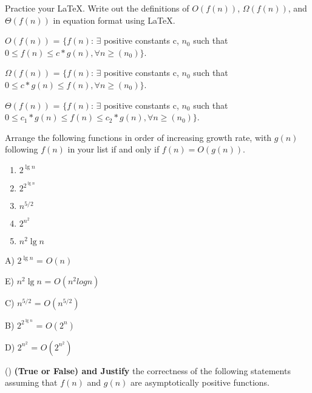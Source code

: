 \documentclass[addpoints,11pt]{exam}
\begin{document}
\begin{questions}


\question[5]
Practice your \LaTeX.  Write out the definitions of $O(f(n))$, $\Omega(f(n))$, and $\Theta(f(n))$ in equation format using \LaTeX. 
\begin{solutionorbox}
        $O(f(n))$ = $\{f(n)$: $\exists$ positive constants c, $n_0$ such that $0 \leq f(n) \leq c*g(n), \forall n \geq (n_0)\}$.
        
        $\Omega(f(n))$ = $\{f(n)$: $\exists$ positive constants c, $n_0$ such that $0 \leq c*g(n) \leq f(n), \forall n \geq (n_0)\}$.

        $\Theta(f(n))$ = $\{f(n)$: $\exists$ positive constants c, $n_0$ such that $0 \leq c_1*g(n) \leq f(n) \leq c_2*g(n), \forall n \geq (n_0)\}$.
\end{solutionorbox}

\newpage


\question[5]  Arrange the following functions in order of increasing growth rate, with $g(n)$ following $f(n)$ in your list if and only if $f(n) = O(g(n))$.
\begin{enumerate}[label=(\alph*)]
	\item $2^{\lg n}$
	\item $2^{2^{\lg n}}$
	\item $n^{5/2}$
	\item $2^{n^{2}}$
	\item $n^2 \lg n$
\end{enumerate}

\begin{solutionorbox}
	A) $2^{\lg n}$ = $O(n)$
 
        E) $n^2 \lg n$ = $O(n^2 logn)$
 
        C) $n^{5/2}$ = $O(n^{5/2})$
        
        B) $2^{2^{\lg n}}$ = $O(2^n)$
        
        D) $2^{n^{2}}$ = $O(2^{n^2})$
\end{solutionorbox}

\newpage


\question (\totalpoints {})
\textbf{(True or False) and Justify} the correctness of the following statements assuming that $f(n)$ and $g(n)$ are asymptotically positive functions.
\begin{parts}

\end{parts}
\end{questions}
\end{document}
